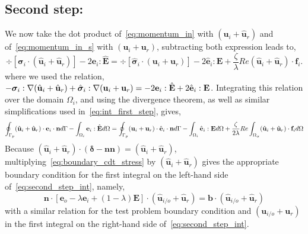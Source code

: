 \subsection{Second step:}

We now take the dot product of~\ref{eq:momentum_in} with $(\hat{\textbf{u}}_i + \hat{\textbf{u}}_r)$ and of~\ref{eq:momentum_in_s} with $(\textbf{u}_i+ \textbf{u}_r)$, subtracting both expression leads to, 
\begin{equation}
    \div [\bm\sigma_{i}\cdot (\hat{\textbf{u}}_i+\hat{\textbf{u}}_r)]
    - 2\textbf{e}_i : \hat{\textbf{E}}
    =
    \div [\hat{\bm\sigma}_{i}\cdot (\textbf{u}_i+\textbf{u}_r)]
    - 2\hat{\textbf{e}}_i :\textbf{E}
    + \frac{\zeta}{\lambda} Re (\hat{\textbf{u}}_i+\hat{\textbf{u}}_r)\cdot \textbf{f}_{i}. 
    \label{eq:second_step_out}
\end{equation}
where we used the relation, $- \bm\sigma_i :\mathbf{\nabla} (\hat{\textbf{u}}_i+\hat{\textbf{u}}_r)+ \hat{\bm\sigma}_i :\mathbf{\nabla} ({\textbf{u}}_i+{\textbf{u}}_r) =
- 2\textbf{e}_i :\hat{\textbf{E}} + 2\hat{\textbf{e}}_i :\textbf{E}$. 
Integrating this relation over the domain $\Omega_i$, and using the divergence theorem, as well as similar simplifications used in~\ref{eq:int_first_step}, gives, 
\begin{equation}
    \intS[p]{ (\hat{\textbf{u}}_i+\hat{\textbf{u}}_r)\cdot \textbf{e}_{i}\cdot\textbf{n}}
    - \intO[i]{\textbf{e}_i : \hat{\textbf{E}}}
    =
    \intS[p]{ (\textbf{u}_i+\textbf{u}_r)\cdot\hat{\textbf{e}}_{i}\cdot \textbf{n}}
    - \intO[i]{\hat{\textbf{e}}_i :\textbf{E}}
    + \frac{\zeta}{2\lambda} Re \intO{(\hat{\textbf{u}}_i+\hat{\textbf{u}}_r)\cdot \textbf{f}_{i}} 
    \label{eq:second_step_int}
\end{equation}
Because $(\hat{\textbf{u}}_i+\hat{\textbf{u}}_r)\cdot (\bm\delta-\textbf{nn}) = (\hat{\textbf{u}}_i+\hat{\textbf{u}}_r)$, multiplying~\ref{eq:boundary_cdt_stress} by $(\hat{\textbf{u}}_i+\hat{\textbf{u}}_r)$ gives the appropriate boundary condition for the first integral on the left-hand side of~\ref{eq:second_step_int}, namely,
\begin{equation}
    \mathbf{n}\cdot [
        \textbf{e}_{o} - \lambda \textbf{e}_i 
        + (1 -\lambda) \textbf{E}
        ]\cdot (\hat{\textbf{u}}_{i/o}+\hat{\textbf{u}}_r)
        =
        \textbf{b}\cdot (\hat{\textbf{u}}_{i/o}+\hat{\textbf{u}}_r)
    \label{eq:boundary_with_the_velocity}
\end{equation}
with a similar relation for the test problem boundary condition and $({\textbf{u}}_{i/o}+{\textbf{u}}_r)$ in the first integral on the right-hand side of~\ref{eq:second_step_int}. 

